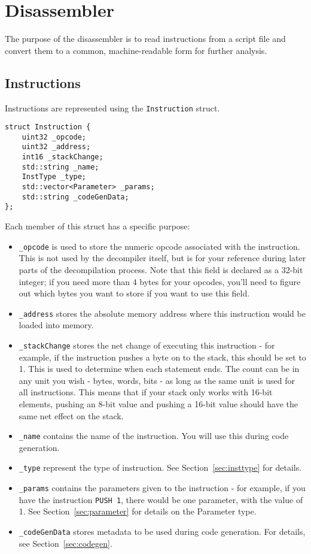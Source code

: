 \section{Disassembler}
The purpose of the disassembler is to read instructions from a script file and convert them to a common, machine-readable form for further analysis.

\subsection{Instructions}
Instructions are represented using the \verb+Instruction+ struct.

\begin{C++}
\begin{lstlisting}
struct Instruction {
	uint32 _opcode;
	uint32 _address;
	int16 _stackChange;
	std::string _name;
	InstType _type;
	std::vector<Parameter> _params;
	std::string _codeGenData;
};
\end{lstlisting}
\end{C++}

Each member of this struct has a specific purpose:
\begin{itemize}
\item \verb+_opcode+ is used to store the numeric opcode associated with the instruction. This is not used by the decompiler itself, but is for your reference during later parts of the decompilation process. Note that this field is declared as a 32-bit integer; if you need more than 4 bytes for your opcodes, you'll need to figure out which bytes you want to store if you want to use this field.
\item \verb+_address+ stores the absolute memory address where this instruction would be loaded into memory.
\item \verb+_stackChange+ stores the net change of executing this instruction - for example, if the instruction pushes a byte on to the stack, this should be set to 1. This is used to determine when each statement ends. The count can be in any unit you wish - bytes, words, bits - as long as the same unit is used for all instructions. This means that if your stack only works with 16-bit elements, pushing an 8-bit value and pushing a 16-bit value should have the same net effect on the stack.
\item \verb+_name+ contains the name of the instruction. You will use this during code generation.
\item \verb+_type+ represent the type of instruction. See Section~\vref{sec:insttype} for details.
\item \verb+_params+ contains the parameters given to the instruction - for example, if you have the instruction \verb+PUSH 1+, there would be one parameter, with the value of 1. See Section~\vref{sec:parameter} for details on the Parameter type.
\item \verb+_codeGenData+ stores metadata to be used during code generation. For details, see Section~\vref{sec:codegen}.
\end{itemize}

